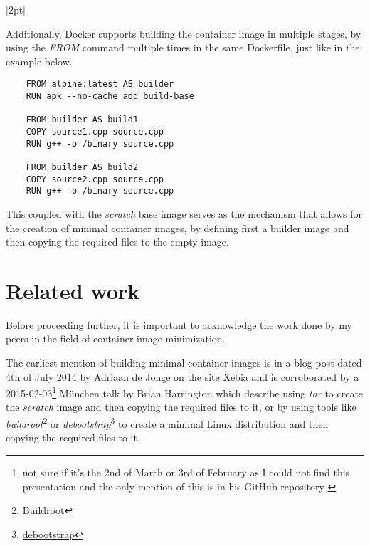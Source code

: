 [2pt]

Additionally, Docker supports building the container image in multiple stages, by using the \textit{FROM} command multiple times in the same Dockerfile, 
just like in the example below.



\lstset{language=Dockerfile,caption=Sample Multi-stage Dockerfile,label=lst:ex-multi-stage-dockerifle}
\begin{lstlisting}
    FROM alpine:latest AS builder
    RUN apk --no-cache add build-base
    
    FROM builder AS build1
    COPY source1.cpp source.cpp
    RUN g++ -o /binary source.cpp
    
    FROM builder AS build2
    COPY source2.cpp source.cpp
    RUN g++ -o /binary source.cpp   
\end{lstlisting}

This coupled with the \textit{scratch} base image serves as the mechanism that allows for the creation of minimal container images, by defining first a 
builder image and then copying the required files to the empty image.

\section{Related work}
\label{sec:related-work}

Before proceeding further, it is important to acknowledge the work done by 
my peers in the field of container image minimization.

The earliest mention of building minimal container images is in a blog post dated 4th of July 2014 by
Adriaan de Jonge on the site Xebia \cite{xebia-post} and is corroborated by a 
2015-02-03\footnote{not sure if it's the 2nd of March or 3rd of February as I could not find this presentation and the only mention of this is in his GitHub repository \cite{minimal-containers-101}} München talk by Brian Harrington \cite{minimal-containers-101}
which describe using \textit{tar} to create the \textit{scratch} image and then copying the required files to it, or by using 
tools like \textit{buildroot}\footnote{\href{https://buildroot.org/}{Buildroot}} or \textit{debootstrap}\footnote{\href{https://wiki.debian.org/Debootstrap}{debootstrap}} to create a minimal Linux distribution and then copying the required files to it.

